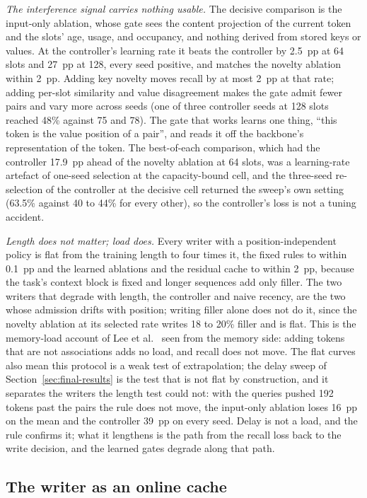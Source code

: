 \documentclass[conference]{IEEEtran}
\begin{document}
\textit{The interference signal carries nothing usable.} The decisive
comparison is the input-only ablation, whose gate sees the content projection
of the current token and the slots' age, usage, and occupancy, and nothing
derived from stored keys or values. At the controller's learning rate it beats
the controller by 2.5~pp at 64 slots and 27~pp at 128, every seed positive,
and matches the novelty ablation within 2~pp. Adding key novelty moves recall
by at most 2~pp at that rate; adding per-slot similarity and value disagreement makes the gate
admit fewer pairs and vary more across seeds (one of three controller seeds at
128 slots reached 48\% against 75 and 78). The gate that works learns one
thing, ``this token is the value position of a pair'', and reads it off the
backbone's representation of the token. The best-of-each comparison, which
had the controller 17.9~pp ahead of the novelty ablation at 64 slots, was a
learning-rate artefact of one-seed selection at the capacity-bound cell, and
the three-seed re-selection of the controller at the decisive cell returned
the sweep's own setting (63.5\% against 40 to 44\% for every other), so the
controller's loss is not a tuning accident.

\textit{Length does not matter; load does.} Every writer with a
position-independent policy is flat from the training length to four times
it, the fixed rules to within 0.1~pp and the learned ablations and the
residual cache to within 2~pp, because the task's context block is fixed and longer
sequences add only filler. The two writers that degrade with length, the
controller and naive recency, are the two whose admission drifts with
position; writing filler alone does not do it, since the novelty ablation at
its selected rate writes 18 to 20\% filler and is flat. This is the
memory-load account of Lee et al.~\cite{lee2026howlinear} seen from the
memory side: adding tokens that are not associations adds no load, and recall
does not move. The flat curves also mean this protocol is a weak test of
extrapolation; the delay sweep of Section~\ref{sec:final-results} is the test
that is not flat by construction, and it separates the writers the length
test could not: with the queries pushed 192 tokens past the pairs the rule
does not move, the input-only ablation loses 16~pp on the mean and the
controller 39~pp on every seed. Delay is not a load, and the rule confirms
it; what it lengthens is the path from the recall loss back to the write
decision, and the learned gates degrade along that path.

\subsection{The writer as an online cache}
\end{document}
